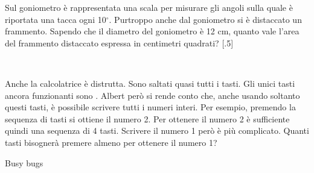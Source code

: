 \documentclass[12pt]{matemaj}
\begin{document}
\vspace{-.8cm}
\quesitotc[1;10]
[.5]Sul goniometro è rappresentata una scala per misurare gli angoli sulla quale è riportata una tacca ogni 10$^\circ$. Purtroppo anche dal goniometro si è distaccato un frammento. Sapendo che il diametro del goniometro è 12 cm, quanto vale l'area del frammento distaccato espressa in centimetri quadrati?
[.5]\tikspace{} \\ \vspace{.3cm}\tikspace{}

\vspace{-.8cm}
\quesito[1;50]
Anche la calcolatrice è distrutta. Sono saltati quasi tutti i tasti. Gli unici tasti ancora funzionanti sono\;   \btn{+} \btn{-} \btn{=}. Albert però si rende conto che, anche usando soltanto questi tasti, è possibile scrivere tutti i numeri interi. Per esempio, premendo la sequenza di tasti  \btn{-}  \btn{=} si ottiene il numero 2. Per ottenere il numero 2 è sufficiente quindi una sequenza di 4 tasti. Scrivere il numero 1 però è più complicato. Quanti tasti bisognerà premere almeno per ottenere il numero 1?

\newpage
\titolo Busy bugs
\end{document}
